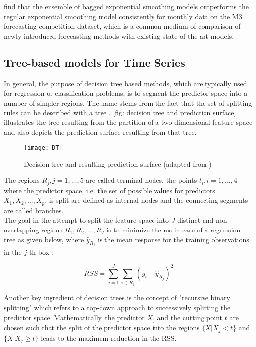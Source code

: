 \textcite{bergmeir} find that the ensemble of bagged exponential smoothing models outperforms the regular exponential smoothing model consistently for monthly data on the M3 forecasting competition dataset, which is a common medium of comparison of newly introduced forecasting methods with existing state of the art models.


\subsection{Tree-based models for Time Series}

In general, the purpose of decision tree based methods, which are typically used for regression or classification problems, is to segment the predictor space into a number of simpler regions. The name stems from the fact that the set of splitting rules can be described with a tree \parencite{james2013}. \cref{fig: decision tree and prediction surface} illustrates the tree resulting from the partition of a two-dimensional feature space and also depicts the prediction surface resulting from that tree.\\

\begin{figure} [h]
\centering
\texttt{[image: DT]}
\caption{Decision tree and resulting prediction surface (adapted from \textcite{james2013})}
\label{fig: decision tree  and prediction surface}
\end{figure}

The regions $R_{j}, j=1,...,5 $ are called terminal nodes, the points $t_{i}, i=1,...,4 $ where the predictor space, i.e. the set of possible values for predictors $X_{1},X_{2},...,X_{p}$, is split are defined as internal nodes and the connecting segments are called branches.\\
The goal in the attempt to split the feature space into $J$ distinct and non-overlapping regions $R_{1}, R_{2},...,R_{J}$ is to minimize the \acrfull{rss} in case of a regression tree as given below, where $\hat{y}_{R_{j}}$ is the mean response for the training observations in the $j$-th box \parencite{james2013}:

\begin{equation} \label{eq: RSS}
	RSS = \sum_{j=1}^{J} \sum_{i \in R_{j}} (y_{i}-\hat{y}_{R_{j}})^{2}
\end{equation}

\noindent Another key ingredient of decision trees is the concept of "recursive binary splitting" which refers to a top-down approach to successively splitting the predictor space. Mathematically, the predictor $ X_{j}$ and the cutting point $t$ are chosen such that the split of the predictor space into the regions $\{X|X_{j} < t\}$ and $\{X|X_{j} \geq t\}$ leads to the maximum reduction in the RSS.

